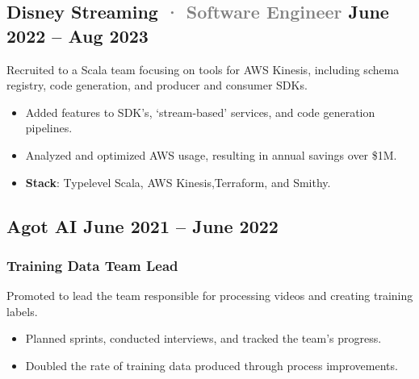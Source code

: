 \documentclass[10pt]{article} %
\providecommand{\tightlist}{%
  \setlength{\itemsep}{0pt}\setlength{\parskip}{0pt}}
\renewcommand{\emph}[1]{%
  \textcolor{gray}{#1}%
}
\begin{document}
\begin{paracol}{2}
\hypertarget{disney-streaming-software-engineer-june-2022-aug-2023}{%
\subsection{\texorpdfstring{Disney Streaming \emph{· \small Software
Engineer} \hfill \small June 2022 -- Aug
2023}{Disney Streaming · Software Engineer June 2022 -- Aug 2023}}\label{disney-streaming-software-engineer-june-2022-aug-2023}}

Recruited to a Scala team focusing on tools for AWS Kinesis, including
schema registry, code generation, and producer and consumer SDKs.

\begin{itemize}
\tightlist
\item
  Added features to SDK's, `stream-based' services, and code generation
  pipelines.
\item
  Analyzed and optimized AWS usage, resulting in annual savings over
  \$1M.
\item
  \textbf{Stack}: Typelevel Scala, AWS Kinesis,Terraform, and Smithy.
\end{itemize}

\hypertarget{agot-ai-june-2021-june-2022}{%
\subsection{\texorpdfstring{Agot AI \hfill \small June 2021 -- June
2022}{Agot AI June 2021 -- June 2022}}\label{agot-ai-june-2021-june-2022}}

\vspace{-5pt}

\hypertarget{training-data-team-lead}{%
\subsubsection{\texorpdfstring{\small Training Data Team
Lead}{Training Data Team Lead}}\label{training-data-team-lead}}

Promoted to lead the team responsible for processing videos and creating
training labels.

\begin{itemize}
\tightlist
\item
  Planned sprints, conducted interviews, and tracked the team's
  progress.
\item
  Doubled the rate of training data produced through process
  improvements.
\end{itemize}


\end{paracol}
\end{document}
